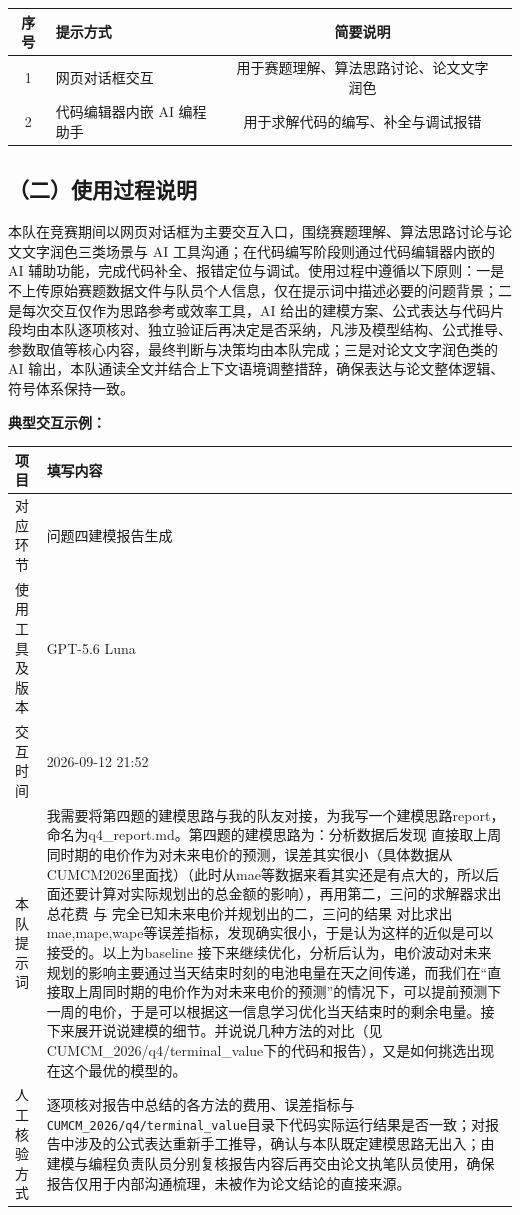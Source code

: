 \documentclass[12pt, a4paper, scheme=chinese, fontset=windows]{ctexart}
\begin{document}
\begin{longtable}{cp{3.6cm}cp{5cm}}
\toprule
序号 & 提示方式 & 简要说明 \\
\midrule
\endhead
1 & 网页对话框交互 &  用于赛题理解、算法思路讨论、论文文字润色 \\
2 & 代码编辑器内嵌 AI 编程助手 &  用于求解代码的编写、补全与调试报错 \\
\bottomrule
\end{longtable}

\subsection*{（二）使用过程说明}

本队在竞赛期间以网页对话框为主要交互入口，围绕赛题理解、算法思路讨论与论文文字润色三类场景与 AI 工具沟通；在代码编写阶段则通过代码编辑器内嵌的 AI 辅助功能，完成代码补全、报错定位与调试。使用过程中遵循以下原则：一是不上传原始赛题数据文件与队员个人信息，仅在提示词中描述必要的问题背景；二是每次交互仅作为思路参考或效率工具，AI 给出的建模方案、公式表达与代码片段均由本队逐项核对、独立验证后再决定是否采纳，凡涉及模型结构、公式推导、参数取值等核心内容，最终判断与决策均由本队完成；三是对论文文字润色类的 AI 输出，本队通读全文并结合上下文语境调整措辞，确保表达与论文整体逻辑、符号体系保持一致。

\textbf{典型交互示例：}
\begin{longtable}{p{3cm}p{10cm}}
\toprule
项目 & 填写内容 \\
\midrule
\endhead
对应环节 & 问题四建模报告生成 \\
使用工具及版本 & GPT-5.6 Luna \\
交互时间 & 2026-09-12 21:52 \\
本队提示词 & 我需要将第四题的建模思路与我的队友对接，为我写一个建模思路report，命名为q4\_report.md。第四题的建模思路为：分析数据后发现 直接取上周同时期的电价作为对未来电价的预测，误差其实很小（具体数据从CUMCM2026里面找）（此时从mae等数据来看其实还是有点大的，所以后面还要计算对实际规划出的总金额的影响），再用第二，三问的求解器求出总花费 与 完全已知未来电价并规划出的二，三问的结果 对比求出mae,mape,wape等误差指标，发现确实很小，于是认为这样的近似是可以接受的。以上为baseline
接下来继续优化，分析后认为，电价波动对未来规划的影响主要通过当天结束时刻的电池电量在天之间传递，而我们在“直接取上周同时期的电价作为对未来电价的预测”的情况下，可以提前预测下一周的电价，于是可以根据这一信息学习优化当天结束时的剩余电量。接下来展开说说建模的细节。并说说几种方法的对比（见CUMCM\_2026/q4/terminal\_value下的代码和报告），又是如何挑选出现在这个最优的模型的。 \\
人工核验方式 & 逐项核对报告中总结的各方法的费用、误差指标与\texttt{CUMCM\_2026/q4/terminal\_value}目录下代码实际运行结果是否一致；对报告中涉及的公式表达重新手工推导，确认与本队既定建模思路无出入；由建模与编程负责队员分别复核报告内容后再交由论文执笔队员使用，确保报告仅用于内部沟通梳理，未被作为论文结论的直接来源。 \\
\bottomrule
\end{longtable}
\end{document}
